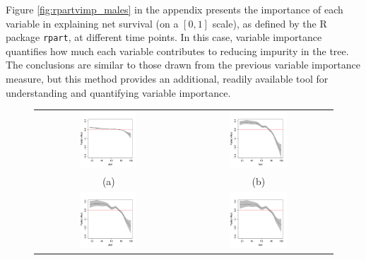 \documentclass[12pt]{article}
\begin{document}
Figure \ref{fig:rpartvimp_males} in the appendix presents the importance of each variable in explaining net survival (on a $[0,1]$ scale), as defined by the R package \texttt{rpart}, at different time points. In this case, variable importance quantifies how much each variable contributes to reducing impurity in the tree. The conclusions are similar to those drawn from the previous variable importance measure, but this method provides an additional, readily available tool for understanding and quantifying variable importance.

\begin{figure}
\centering
\begin{tabular}{cc}
   \includegraphics[width=0.4\textwidth]{peff1_males.pdf}  &
   \includegraphics[width=0.4\textwidth]{peff10_males.pdf} \\
   (a) & (b) \\
   \includegraphics[width=0.4\textwidth]{peff20_males.pdf} & 
   \includegraphics[width=0.4\textwidth]{peff30_males.pdf} \\

\end{tabular}
\end{figure}
\end{document}
